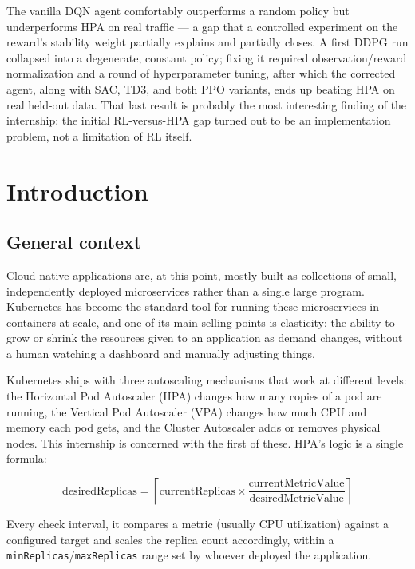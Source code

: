 \documentclass{rapportINPTCLOUD}
\begin{document}
The vanilla DQN agent comfortably outperforms a random policy but underperforms HPA on real traffic — a gap that a controlled experiment on the reward's stability weight partially explains and partially closes. A first DDPG run collapsed into a degenerate, constant policy; fixing it required observation/reward normalization and a round of hyperparameter tuning, after which the corrected agent, along with SAC, TD3, and both PPO variants, ends up beating HPA on real held-out data. That last result is probably the most interesting finding of the internship: the initial RL-versus-HPA gap turned out to be an implementation problem, not a limitation of RL itself.

\clearpage

\chapter{Introduction}

\section{General context}

Cloud-native applications are, at this point, mostly built as collections of small, independently deployed microservices rather than a single large program. Kubernetes has become the standard tool for running these microservices in containers at scale, and one of its main selling points is elasticity: the ability to grow or shrink the resources given to an application as demand changes, without a human watching a dashboard and manually adjusting things.

Kubernetes ships with three autoscaling mechanisms that work at different levels: the Horizontal Pod Autoscaler (HPA) changes how many copies of a pod are running, the Vertical Pod Autoscaler (VPA) changes how much CPU and memory each pod gets, and the Cluster Autoscaler adds or removes physical nodes. This internship is concerned with the first of these. HPA's logic is a single formula:

\begin{equation}
\text{desiredReplicas} = \left\lceil \text{currentReplicas} \times \frac{\text{currentMetricValue}}{\text{desiredMetricValue}} \right\rceil
\end{equation}

Every check interval, it compares a metric (usually CPU utilization) against a configured target and scales the replica count accordingly, within a \texttt{minReplicas}/\texttt{maxReplicas} range set by whoever deployed the application.
\end{document}
